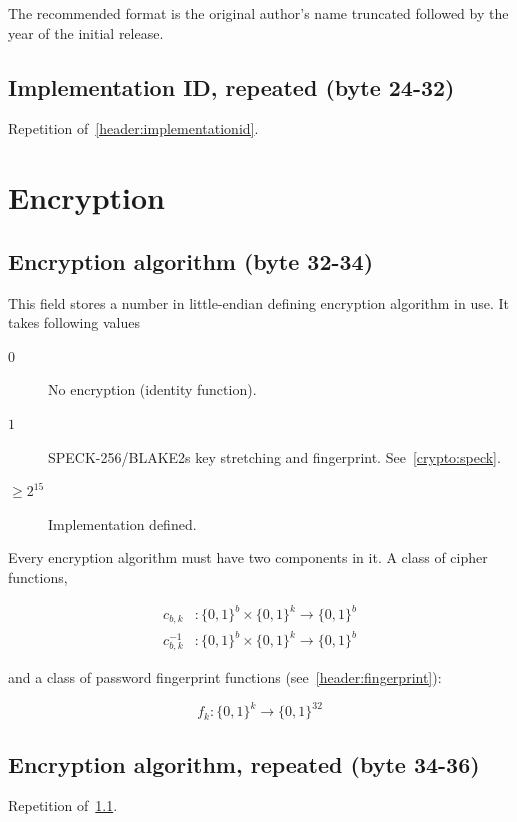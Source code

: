 \documentclass[11pt,a4paper]{report}
\begin{document}
        The recommended format is the original author's name truncated
        followed by the year of the initial release.

        \subsection{Implementation ID, repeated (byte 24-32)}
        Repetition of~\ref{header:implementationid}.

    \section{Encryption}
        \subsection{Encryption algorithm (byte 32-34)}
        \label{header:encryption}
        This field stores a number in little-endian defining encryption
        algorithm in use. It takes following values

        \begin{description}
            \item [$0$] No encryption (identity function).
            \item [$1$] SPECK-256/BLAKE2s key stretching and fingerprint.
                See~\ref{crypto:speck}.
            \item [$\geq 2^{15}$] Implementation defined.
        \end{description}

        Every encryption algorithm must have two components in it. A class of
        cipher functions,

        \begin{align*}
            c_{b, k}      &: \{0, 1\}^b \times \{0, 1\}^k \to \{0, 1\}^b \\
            c_{b, k}^{-1} &: \{0, 1\}^b \times \{0, 1\}^k \to \{0, 1\}^b
        \end{align*}

        and a class of password fingerprint functions (see~\ref{header:fingerprint}):

        $$f_k : \{0,1\}^k \to \{0,1\}^{32}$$

        \subsection{Encryption algorithm, repeated (byte 34-36)}
        Repetition of~\ref{header:encryption}.
\end{document}
